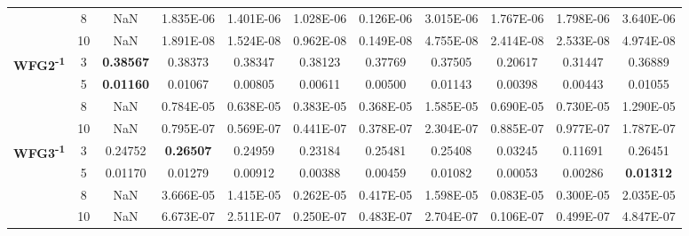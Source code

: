 \documentclass[conference]{IEEEtran}
\begin{document}
\begin{table*}[!htb]
\begin{tabular}{|c|c|c|c|c|c|c|c|c|c|c|}
	& 8          & NaN              & 1.835E-06         & 1.401E-06             & 1.028E-06        & 0.126E-06           & 3.015E-06           & 1.767E-06          & 1.798E-06            & 3.640E-06        \\ \cline{2-11} 
	& 10         & NaN              & 1.891E-08         & 1.524E-08             & 0.962E-08        & 0.149E-08           & 4.755E-08           & 2.414E-08          & 2.533E-08            & 4.974E-08        \\ \hline
	\multirow{4}{*}{\textbf{WFG2\textsuperscript{-1}}}  & 3          & \textbf{0.38567} & 0.38373           & 0.38347               & 0.38123          & 0.37769             & 0.37505             & 0.20617            & 0.31447              & 0.36889          \\ \cline{2-11} 
	& 5          & \textbf{0.01160} & 0.01067           & 0.00805               & 0.00611          & 0.00500             & 0.01143             & 0.00398            & 0.00443              & 0.01055          \\ \cline{2-11} 
	& 8          & NaN              & 0.784E-05         & 0.638E-05             & 0.383E-05        & 0.368E-05           & 1.585E-05           & 0.690E-05          & 0.730E-05            & 1.290E-05        \\ \cline{2-11} 
	& 10         & NaN              & 0.795E-07         & 0.569E-07             & 0.441E-07        & 0.378E-07           & 2.304E-07           & 0.885E-07          & 0.977E-07            & 1.787E-07        \\ \hline
	\multirow{4}{*}{\textbf{WFG3\textsuperscript{-1}}}  & 3          & 0.24752          & \textbf{0.26507}  & 0.24959               & 0.23184          & 0.25481             & 0.25408             & 0.03245            & 0.11691              & 0.26451          \\ \cline{2-11} 
	& 5          & 0.01170          & 0.01279           & 0.00912               & 0.00388          & 0.00459             & 0.01082             & 0.00053            & 0.00286              & \textbf{0.01312} \\ \cline{2-11} 
	& 8          & NaN              & 3.666E-05         & 1.415E-05             & 0.262E-05        & 0.417E-05           & 1.598E-05           & 0.083E-05          & 0.300E-05            & 2.035E-05        \\ \cline{2-11} 
	& 10         & NaN              & 6.673E-07         & 2.511E-07             & 0.250E-07        & 0.483E-07           & 2.704E-07           & 0.106E-07          & 0.499E-07            & 4.847E-07        \\ \hline

\end{tabular}
\end{table*}
\end{document}
